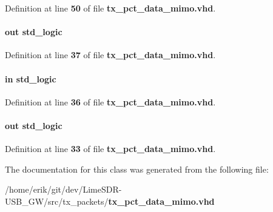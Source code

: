Definition at line {\bf 50} of file {\bf tx\+\_\+pct\+\_\+data\+\_\+mimo.\+vhd}.

\paragraph[{tst\+\_\+aclr\+\_\+ext}]{ {\bfseries \textcolor{keywordflow}{out}\textcolor{vhdlchar}{ }} {\bfseries \textcolor{comment}{std\+\_\+logic}\textcolor{vhdlchar}{ }} \hspace{0.3cm}{\ttfamily [Port]}}\label{classtx__pct__data__mimo_a23b4bf10956834667bc698222eca5526}


Definition at line {\bf 37} of file {\bf tx\+\_\+pct\+\_\+data\+\_\+mimo.\+vhd}.

\paragraph[{tx\+\_\+en}]{ {\bfseries \textcolor{keywordflow}{in}\textcolor{vhdlchar}{ }} {\bfseries \textcolor{comment}{std\+\_\+logic}\textcolor{vhdlchar}{ }} \hspace{0.3cm}{\ttfamily [Port]}}\label{classtx__pct__data__mimo_a844b5ac3b04ba9f57e4bcb2edcede053}


Definition at line {\bf 36} of file {\bf tx\+\_\+pct\+\_\+data\+\_\+mimo.\+vhd}.

\paragraph[{tx\+\_\+outfifo\+\_\+rdy}]{ {\bfseries \textcolor{keywordflow}{out}\textcolor{vhdlchar}{ }} {\bfseries \textcolor{comment}{std\+\_\+logic}\textcolor{vhdlchar}{ }} \hspace{0.3cm}{\ttfamily [Port]}}\label{classtx__pct__data__mimo_a97619b0e6bd83cf1b714dfc609a56a82}


Definition at line {\bf 33} of file {\bf tx\+\_\+pct\+\_\+data\+\_\+mimo.\+vhd}.



The documentation for this class was generated from the following file\+:\begin{DoxyCompactItemize}
\item 
/home/erik/git/dev/\+Lime\+S\+D\+R-\/\+U\+S\+B\+\_\+\+G\+W/src/tx\+\_\+packets/{\bf tx\+\_\+pct\+\_\+data\+\_\+mimo.\+vhd}\end{DoxyCompactItemize}
